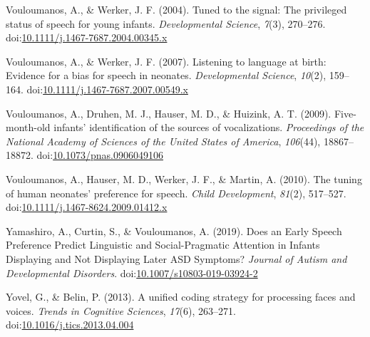 \documentclass[man]{apa6}
\begin{document}
\hypertarget{ref-vouloumanos_tuned_2004}{}
Vouloumanos, A., \& Werker, J. F. (2004). Tuned to the signal: The
privileged status of speech for young infants. \emph{Developmental
Science}, \emph{7}(3), 270--276.
doi:\href{https://doi.org/10.1111/j.1467-7687.2004.00345.x}{10.1111/j.1467-7687.2004.00345.x}

\hypertarget{ref-vouloumanos_listening_2007}{}
Vouloumanos, A., \& Werker, J. F. (2007). Listening to language at
birth: Evidence for a bias for speech in neonates. \emph{Developmental
Science}, \emph{10}(2), 159--164.
doi:\href{https://doi.org/10.1111/j.1467-7687.2007.00549.x}{10.1111/j.1467-7687.2007.00549.x}

\hypertarget{ref-vouloumanos_five-month-old_2009}{}
Vouloumanos, A., Druhen, M. J., Hauser, M. D., \& Huizink, A. T. (2009).
Five-month-old infants' identification of the sources of vocalizations.
\emph{Proceedings of the National Academy of Sciences of the United
States of America}, \emph{106}(44), 18867--18872.
doi:\href{https://doi.org/10.1073/pnas.0906049106}{10.1073/pnas.0906049106}

\hypertarget{ref-vouloumanos_tuning_2010}{}
Vouloumanos, A., Hauser, M. D., Werker, J. F., \& Martin, A. (2010). The
tuning of human neonates' preference for speech. \emph{Child
Development}, \emph{81}(2), 517--527.
doi:\href{https://doi.org/10.1111/j.1467-8624.2009.01412.x}{10.1111/j.1467-8624.2009.01412.x}

\hypertarget{ref-yamashiro_does_2019}{}
Yamashiro, A., Curtin, S., \& Vouloumanos, A. (2019). Does an Early
Speech Preference Predict Linguistic and Social-Pragmatic Attention in
Infants Displaying and Not Displaying Later ASD Symptoms? \emph{Journal
of Autism and Developmental Disorders}.
doi:\href{https://doi.org/10.1007/s10803-019-03924-2}{10.1007/s10803-019-03924-2}

\hypertarget{ref-yovel_unified_2013}{}
Yovel, G., \& Belin, P. (2013). A unified coding strategy for processing
faces and voices. \emph{Trends in Cognitive Sciences}, \emph{17}(6),
263--271.
doi:\href{https://doi.org/10.1016/j.tics.2013.04.004}{10.1016/j.tics.2013.04.004}

\endgroup
\end{document}
